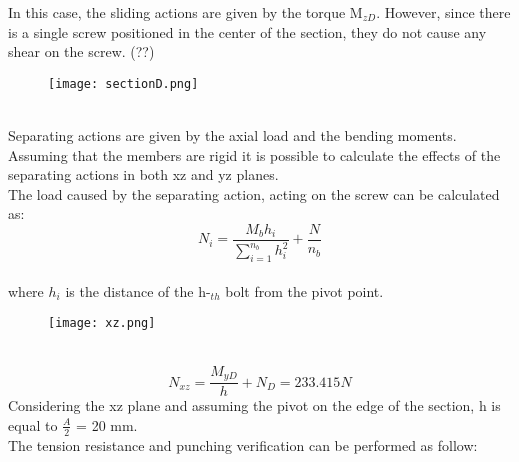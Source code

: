 In this case, the sliding actions are given by the torque M$_{zD}$. However, since there is a single screw positioned in the center of the section, they do not cause any shear on the screw. (??) \\
\begin{figure}[h!]
    \centering
    \texttt{[image: sectionD.png]}
    \caption{}
    \label{fig: pivot joint}
\end{figure}\\
Separating actions are given by the axial load and the bending moments. Assuming that the members are rigid it is possible to calculate the effects of the separating actions in both xz and yz planes.\\
The load caused by the separating action, acting on the screw can be calculated as:\\
\begin{equation}
    N_{i} = \frac{M_{b}h_{i}}{\sum\limits_{i=1}^{n_{b}} h^2_{i}} + \frac{N}{n_{b}}
\end{equation}\\
where $h_{i}$ is the distance of the h-$_{th}$ bolt from the pivot point.\\
\begin{figure}[h!]
    \centering
    \texttt{[image: xz.png]}
    \caption{}
    \label{fig:xz}
\end{figure}\\
\begin{equation}
    N_{xz} = \frac{M_{yD}}{h} + N_{D} = 233.415 N
\end{equation}
Considering the xz plane and assuming the pivot on the edge of the section, h is equal to $\frac{A}{2}$ = 20 mm.\\
The tension resistance and punching verification can be performed as follow:
